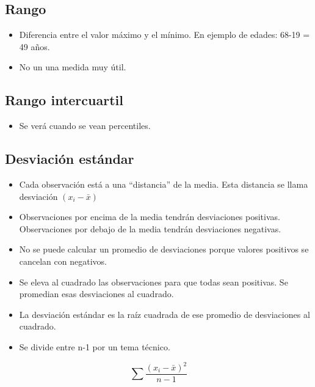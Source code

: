 \documentclass[
]{article}
\providecommand{\tightlist}{%
  \setlength{\itemsep}{0pt}\setlength{\parskip}{0pt}}
\begin{document}
\hypertarget{rango}{%
\subsection{Rango}\label{rango}}

\begin{itemize}
\item
  Diferencia entre el valor máximo y el mínimo. En ejemplo de edades:
  68-19 = 49 años.
\item
  No un una medida muy útil.
\end{itemize}

\hypertarget{rango-intercuartil}{%
\subsection{Rango intercuartil}\label{rango-intercuartil}}

\begin{itemize}
\tightlist
\item
  Se verá cuando se vean percentiles.
\end{itemize}

\hypertarget{desviaciuxf3n-estuxe1ndar}{%
\subsection{Desviación estándar}\label{desviaciuxf3n-estuxe1ndar}}

\begin{itemize}
\item
  Cada observación está a una ``distancia'' de la media. Esta distancia
  se llama desviación \((x_i-\bar{x})\)
\item
  Observaciones por encima de la media tendrán desviaciones positivas.
  Observaciones por debajo de la media tendrán desviaciones negativas.
\item
  No se puede calcular un promedio de desviaciones porque valores
  positivos se cancelan con negativos.
\item
  Se eleva al cuadrado las observaciones para que todas sean positivas.
  Se promedian esas desviaciones al cuadrado.
\item
  La desviación estándar es la raíz cuadrada de ese promedio de
  desviaciones al cuadrado.
\item
  Se divide entre n-1 por un tema técnico.
\end{itemize}

\[
\sum \frac{(x_i-\bar{x})^2} {n-1} 
\]
\end{document}
